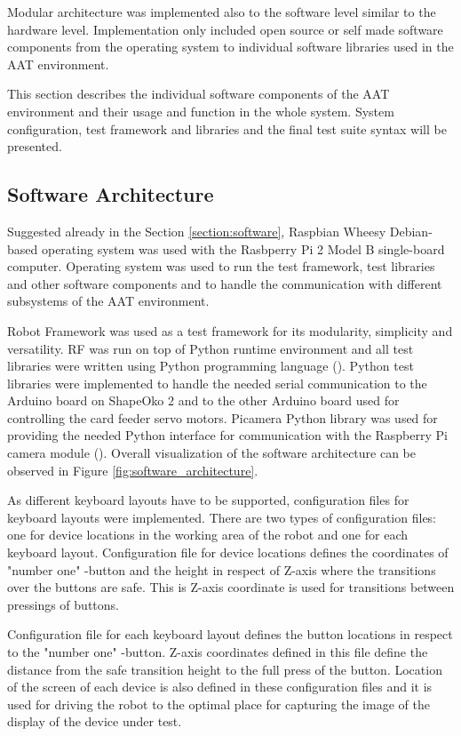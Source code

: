 Modular architecture was implemented also to the software level similar to the hardware level. Implementation only included open source or self made software components from the operating system to individual software libraries used in the AAT environment.

This section describes the individual software components of the AAT environment and their usage and function in the whole system. System configuration, test framework and libraries and the final test suite syntax will be presented.

\subsection{Software Architecture}
\label{subsection:Software architecture}

Suggested already in the Section \ref{section:software}, Raspbian Wheesy Debian-based operating system was used with the Rasbperry Pi 2 Model B single-board computer. Operating system was used to run the test framework, test libraries and other software components and to handle the communication with different subsystems of the AAT environment.

Robot Framework was used as a test framework for its modularity, simplicity and versatility. RF was run on top of Python runtime environment and all test libraries were written using Python programming language (\emph{\cite{python}}). Python test libraries were implemented to handle the needed serial communication to the Arduino board on ShapeOko 2 and to the other Arduino board used for controlling the card feeder servo motors. Picamera Python library was used for providing the needed Python interface for communication with the Raspberry Pi camera module (\emph{\cite{picamera}}). Overall visualization of the software architecture can be observed in Figure \ref{fig:software_architecture}.

As different keyboard layouts have to be supported, configuration files for keyboard layouts were implemented. There are two types of configuration files: one for device locations in the working area of the robot and one for each keyboard layout. Configuration file for device locations defines the coordinates of "number one" -button and the height in respect of Z-axis where the transitions over the buttons are safe. This is Z-axis coordinate is used for transitions between pressings of buttons. 

Configuration file for each keyboard layout defines the button locations in respect to the "number one" -button. Z-axis coordinates defined in this file define the distance from the safe transition height to the full press of the button. Location of the screen of each device is also defined in these configuration files and it is used for driving the robot to the optimal place for capturing the image of the display of the device under test. 

